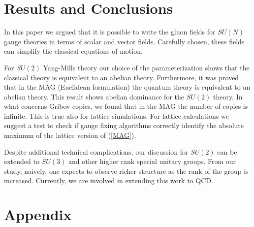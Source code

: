 \documentclass[a4paper,a4paper]{article}
\begin{document}
\section{Results and Conclusions}

In this paper we argued that it is possible to write the gluon fields 
for $SU(N)$ gauge theories in terms of scalar and vector fields. Carefully
chosen, these fields can simplify the classical equations of motion.

For $SU(2)$ Yang-Mills theory our choice of the parameterization shows
that the classical theory is equivalent to an abelian theory. 
Furthermore, it was proved that in the MAG (Euclidean formulation) 
the quantum theory is equivalent to an abelian theory. This
result shows abelian dominance for the $SU(2)$ theory. In what concerns
Gribov copies, we found that in the MAG the number of copies is
infinite. This is true also for lattice simulations.
For lattice calculations we suggest a test to check
if gauge fixing algorithms correctly identify the absolute maximum of
the lattice version of (\ref{MAG}).

Despite additional technical complications, our discussion for $SU(2)$ can 
be extended to $SU(3)$ \cite{OO3} and other higher rank special unitary 
groups. From our study, naively, one expects to observe richer structure 
as the rank of the group is increased. Currently, we are 
involved in extending this work to QCD.



\section*{Appendix}
\end{document}
